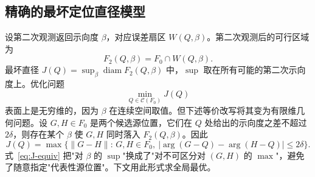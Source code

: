 \documentclass[12pt,a4paper]{ctexart}
\newcommand{\diam}{\operatorname{diam}}
\begin{document}
\subsection{精确的最坏定位直径模型}
\label{sec:q2-minimax}
设第二次观测返回示向度 $\beta$，对应误差扇区 $W(Q,\beta)$。第二次观测后的可行区域为
\begin{equation}
 F_2(Q,\beta)=F_0\cap W(Q,\beta).
\end{equation}
最坏直径 $J(Q)=\sup_\beta \diam F_2(Q,\beta)$ 中，$\sup$ 取在所有可能的第二次示向度上。优化问题
\begin{equation}
 \min_{Q\in\mathcal C(F_0)} J(Q)
 \label{eq:opt-J}
\end{equation}
表面上是无穷维的，因为 $\beta$ 在连续空间取值。但下述等价改写将其变为有限维几何问题。设 $G,H\in F_0$ 是两个候选源位置，它们在 $Q$ 处给出的示向度之差不超过 $2\delta$，则存在某个 $\beta$ 使 $G,H$ 同时落入 $F_2(Q,\beta)$。因此
\begin{equation}
 J(Q)=\max\bigl\{\|G-H\|:\,G,H\in F_0,\ |\arg(G-Q)-\arg(H-Q)|\le2\delta\bigr\}.
 \label{eq:J-equiv}
\end{equation}
式~\eqref{eq:J-equiv} 把"对 $\beta$ 的 $\sup$"换成了"对不可区分对 $(G,H)$ 的 $\max$"，避免了随意指定"代表性源位置"。下文用此形式求全局最优。
\end{document}
